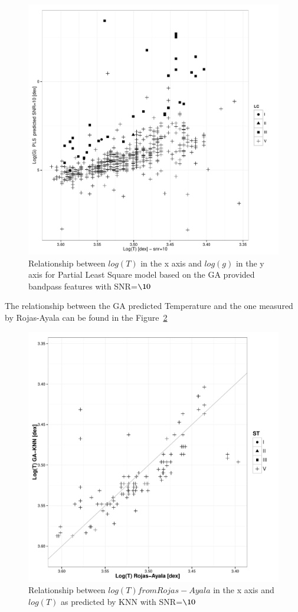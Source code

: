 \begin{figure}
 \begin{center}
 \includegraphics[width=12cm]{figs/ipac_LG_T_PLS_10.pdf}
 \caption{Relationship between $log(T) $ in the x axis 
 and $log(g)$ in the y axis for Partial Least Square model based on the GA provided bandpass features with SNR=$\10$}
 \label{fig:lt_lg_pls}
 \end{center}
\end{figure}

The relationship between the GA predicted Temperature and the one measured by Rojas-Ayala can be 
found in the Figure~\ref{fig:ipac_lt_lt}
\begin{figure}
 \begin{center}
 \includegraphics[width=12cm]{figs/ipac_LG_Trojas_Tknn_10.pdf}
 \caption{Relationship between $log(T) from Rojas-Ayala $ in the x axis 
 and $log(T)$ as predicted by KNN with SNR=$\10$}
 \label{fig:ipac_lt_lt}
 \end{center}
\end{figure}

